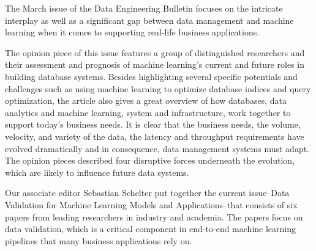 \documentclass[11pt]{article}
\begin{document}
The March issue of the Data Engineering Bulletin focuses on the
intricate interplay as well as a significant gap between data
management and machine learning when it comes to supporting real-life
business applications.

The opinion piece of this issue features a group of distinguished
researchers and their assessment and prognosis of machine learning's
current and future roles in building database systems. Besides
highlighting several specific potentials and challenges such as using
machine learning to optimize database indices and query optimization,
the article also gives a great overview of how databases, data
analytics and machine learning, system and infrastructure, work
together to support today's business needs. It is clear that the
business needs, the volume, velocity, and variety of the data, the
latency and throughput requirements have evolved dramatically and in
consequence, data management systems must adapt. The opinion pieces
described four disruptive forces underneath the evolution, which are
likely to influence future data systems.

Our associate editor Sebastian Schelter put together the current
issue--Data Validation for Machine Learning Models and
Applications--that consists of six papers from leading researchers in
industry and academia. The papers focus on data validation, which is a
critical component in end-to-end machine learning pipelines that many
business applications rely on.
\end{document}
